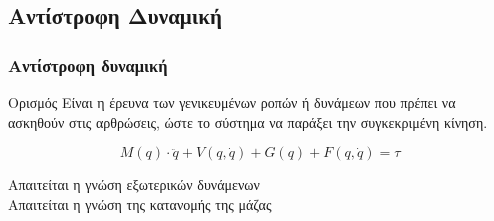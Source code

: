 \documentclass[8pt,sans,mathserif]{beamer}%
\begin{document}
\subsection{Αντίστροφη Δυναμική}
\begin{frame}
\frametitle{Αντίστροφη δυναμική}

    \begin{block}{Ορισμός}
           Είναι η έρευνα των γενικευμένων ροπών ή δυνάμεων που πρέπει να ασκηθούν στις αρθρώσεις, ώστε το σύστημα να παράξει την συγκεκριμένη κίνηση.
    \end{block}

    \pause

    \begin{equation*}
        M(q) \cdot \ddot{q} + V(q, \dot{q}) + G(q) + F(q, \dot{q}) = \tau
    \end{equation*}

    \pause

    \begin{center}
        \alert{Απαιτείται η γνώση εξωτερικών δυνάμενων}\\
        \alert{Απαιτείται η γνώση της κατανομής της μάζας}
    \end{center}
\end{frame}
\end{document}

